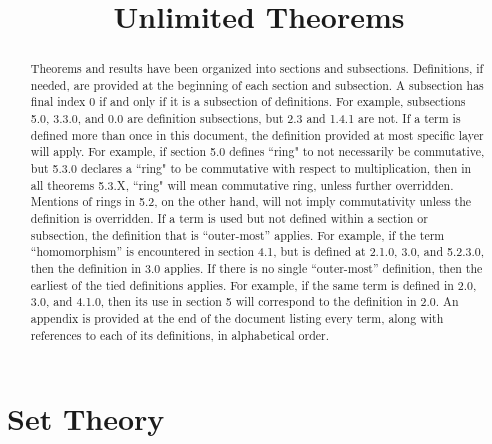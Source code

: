 \documentclass{article}
\title{Unlimited Theorems}
\date{}
\theoremstyle{definition}
\begin{document}
\maketitle
\begin{abstract}
    \noindent
    Theorems and results have been organized into sections and subsections. Definitions, if needed, are provided at the beginning of each section and subsection. A subsection has final index 0 if and only if it is a subsection of definitions. For example, subsections 5.0, 3.3.0, and 0.0 are definition subsections, but 2.3 and 1.4.1 are not.
    \newline
    \newline
    \noindent    
    If a term is defined more than once in this document, the definition provided at most specific layer will apply. For example, if section 5.0 defines ``ring" to not necessarily be commutative, but 5.3.0 declares a ``ring" to be commutative with respect to multiplication, then in all theorems 5.3.X, ``ring" will mean commutative ring, unless further overridden. Mentions of rings in 5.2, on the other hand, will not imply commutativity unless the definition is overridden.
    \newline
    \newline
    \noindent
    If a term is used but not defined within a section or subsection, the definition that is ``outer-most'' applies. For example, if the term ``homomorphism'' is encountered in section 4.1, but is defined at 2.1.0, 3.0, and 5.2.3.0, then the definition in 3.0 applies. If there is no single ``outer-most'' definition, then the earliest of the tied definitions applies. For example, if the same term is defined in 2.0, 3.0, and 4.1.0, then its use in section 5 will correspond to the definition in 2.0.
    \newline
    \newline
    \noindent
    An appendix is provided at the end of the document listing every term, along with references to each of its definitions, in alphabetical order.

\end{abstract}
\newpage

\tableofcontents
\newpage

\section{Set Theory}

\setcounter{subsection}{-1}
\end{document}
